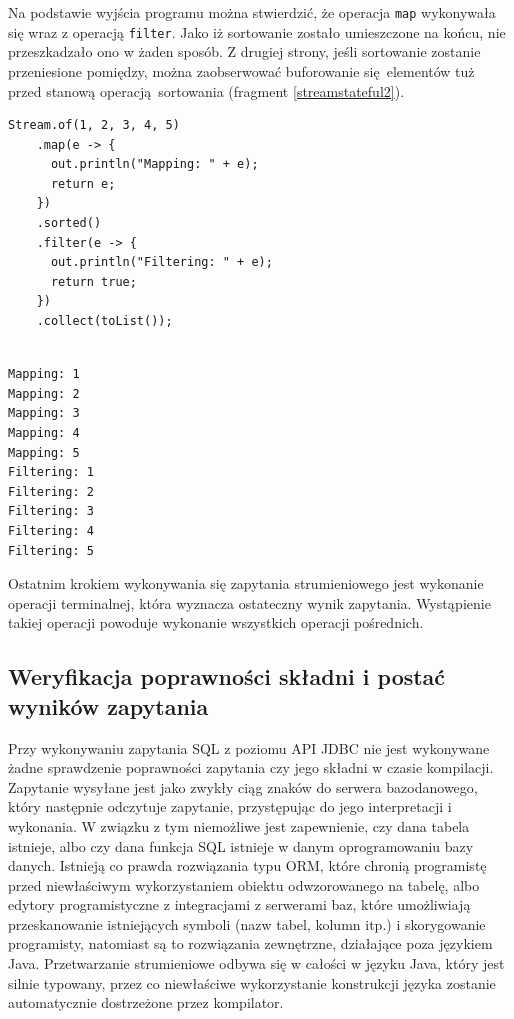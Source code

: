 \documentclass[12pt,twoside,openright]{extarticle}
\begin{document}
    Na podstawie wyjścia programu można stwierdzić, że operacja \texttt{map} wykonywała się wraz z operacją \texttt{filter}. Jako iż sortowanie zostało umieszczone na końcu, nie przeszkadzało ono w żaden sposób. Z drugiej strony, jeśli sortowanie zostanie przeniesione pomiędzy, można zaobserwować buforowanie się elementów tuż przed stanową operacją sortowania (fragment \ref{streamstateful2}).

\begin{lstlisting}[label=streamstateful2, caption=Brak fuzji operacji stanowych]
Stream.of(1, 2, 3, 4, 5)
    .map(e -> {
      out.println("Mapping: " + e);
      return e;
    })
    .sorted()
    .filter(e -> {
      out.println("Filtering: " + e);
      return true;
    })
    .collect(toList());
\end{lstlisting}

\begin{verbatim}

Mapping: 1
Mapping: 2
Mapping: 3
Mapping: 4
Mapping: 5
Filtering: 1
Filtering: 2
Filtering: 3
Filtering: 4
Filtering: 5

\end{verbatim}

    Ostatnim krokiem wykonywania się zapytania strumieniowego jest wykonanie operacji terminalnej, która wyznacza ostateczny wynik zapytania. Wystąpienie takiej operacji powoduje wykonanie wszystkich operacji pośrednich. 

\subsection{Weryfikacja poprawności składni i postać wyników zapytania}

    Przy wykonywaniu zapytania SQL z poziomu API JDBC nie jest wykonywane żadne sprawdzenie poprawności zapytania czy jego składni w czasie kompilacji. Zapytanie wysyłane jest jako zwykły ciąg znaków do serwera bazodanowego, który następnie odczytuje zapytanie, przystępując do jego interpretacji i wykonania. W związku z tym niemożliwe jest zapewnienie, czy dana tabela istnieje, albo czy dana funkcja SQL istnieje w danym oprogramowaniu bazy danych. Istnieją co prawda rozwiązania typu ORM, które chronią programistę przed niewłaściwym wykorzystaniem obiektu odwzorowanego na tabelę, albo edytory programistyczne z integracjami z serwerami baz, które umożliwiają przeskanowanie istniejących symboli (nazw tabel, kolumn itp.) i skorygowanie programisty, natomiast są to rozwiązania zewnętrzne, działające poza językiem Java. Przetwarzanie strumieniowe odbywa się w całości w języku Java, który jest silnie typowany, przez co niewłaściwe wykorzystanie konstrukcji języka zostanie automatycznie dostrzeżone przez kompilator.
    
\end{document}
